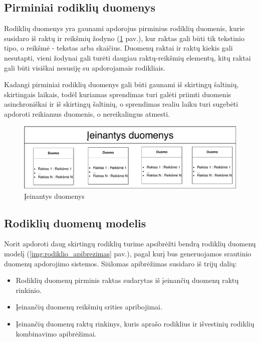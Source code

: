 \documentclass{VUMIFPSbakalaurinis}
\begin{document}
\subsection{Pirminiai rodiklių duomenys}

Rodiklių duomenys yra gaunami apdorojus pirminius rodiklių duomenis, kurie susidaro iš raktų ir reikšmių žodyno (\ref{img:duomenys} pav.), kur raktas gali būti tik tekstinio tipo, o reikšmė - tekstas arba skaičius. Duomenų raktai ir raktų kiekis gali nesutapti, vieni žodynai gali turėti daugiau raktų-reikšmių elementų, kitų raktai gali būti visiškai nesusiję su apdorojamais rodikliais. \par 
Kadangi pirminiai rodiklių duomenys gali būti gaunami iš skirtingų šaltinių, skirtingais laikais, todėl kuriamas sprendimas turi galėti priimti duomenis asinchroniškai ir iš skirtingų šaltinių, o sprendimas realiu laiku turi sugebėti apdoroti reikiamus duomenis, o nereikalingus atmesti. 

\begin{figure}[H]
    \centering
    \includegraphics[width=1\textwidth]{img/duomenys.pdf}
    \caption{Įeinantys duomenys}
    \label{img:duomenys}
\end{figure}

\subsection{Rodiklių duomenų modelis}

Norit apdoroti daug skirtingų rodiklių turime apsibrėžti bendrą rodiklių duomenų modelį (\ref{img:rodiklio_apibrezimas} pav.), pagal kurį bus generuojamos srautinio duomenų apdorojimo sistemos. Siūlomas apibrėžimas susidaro iš trijų dalių: 
\begin{itemize}
    \item Rodiklių duomenų pirminis raktas sudarytas iš įeinančių duomenų raktų rinkinio.
    \item Įeinančių duomenų reikšmių srities apribojimai.
    \item Įeinančių duomenų raktų rinkinys, kuris aprašo rodiklius ir išvestinių rodiklių kombinavimo apibrėžimai. 
\end{itemize}
\end{document}
